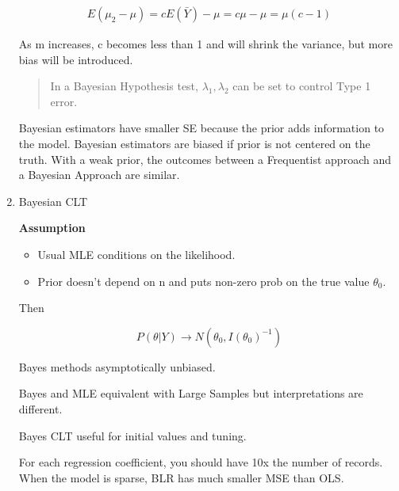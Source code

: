 \documentclass[11pt]{article}
\begin{document}
\begin{enumerate}
\begin{equation}
\begin{split}
E(\mu_2 - \mu) = c E(\bar Y) - \mu = c\mu - \mu = \mu (c - 1)
\end{split}
\end{equation}

As m increases, c becomes less than 1 and will shrink the variance, but more bias will be introduced.

\begin{quote}
In a Bayesian Hypothesis test, \(\lambda_1, \lambda_2\) can be set to control Type 1 error.
\end{quote}

Bayesian estimators have smaller SE because the prior adds information to the model.
Bayesian estimators are biased if prior is not centered on the truth. With a weak prior, the outcomes between a Frequentist approach and a Bayesian Approach are similar.


\item Bayesian CLT
\label{sec:org347ce20}

\textbf{Assumption}
\begin{itemize}
\item Usual MLE conditions on the likelihood.
\item Prior doesn't depend on n and puts non-zero prob on the true value \(\theta_0\).
\end{itemize}

Then

$$
P(\theta | Y) \to N(\theta_0, I(\theta_0)^{-1})
$$

Bayes methods asymptotically unbiased.

Bayes and MLE equivalent with Large Samples but interpretations are different.

Bayes CLT useful for initial values and tuning.

For each regression coefficient, you should have 10x the number of records. When the model is sparse, BLR has much smaller MSE than OLS.
\end{enumerate}
\end{document}
